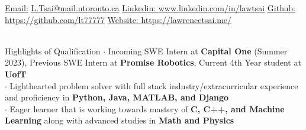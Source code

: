 \documentclass[UTF8]{resume} %
\begin{document}
  \scriptsize\underline{Email:}
            \href{L.Tsai@mail.utoronto.ca}{L.Tsai@mail.utoronto.ca}     {  }
            {\scriptsize\underline{Linkedin: }}\href{https://www.linkedin.com/in/lawtsai}{www.linkedin.com/in/lawtsai}
            {        }
           {\scriptsize\underline{Github: }}\href{https://github.com/lt77777}{https://github.com/lt77777}
           {        }
           {\scriptsize\underline{Website: }}\href{https://lawrencetsai.me/}{https://lawrencetsai.me/}\\
~\vspace{-0.6cm}


\begin{rSection}{Highlights of Qualification}
    \scriptsize{
    $\cdot$ Incoming SWE Intern at \textbf{Capital One} (Summer 2023), Previous SWE Intern at \textbf{Promise Robotics}, Current 4th Year student at \textbf{UofT}\\
    $\cdot$ Lighthearted problem solver with full stack industry/extracurricular experience and proficiency in \textbf{Python, Java, MATLAB, and Django}\\
    $\cdot$ Eager learner that is working towards mastery of \textbf{C, C++, and Machine Learning} along with advanced studies in \textbf{Math and Physics}
    }
\end{rSection}
\end{document}
